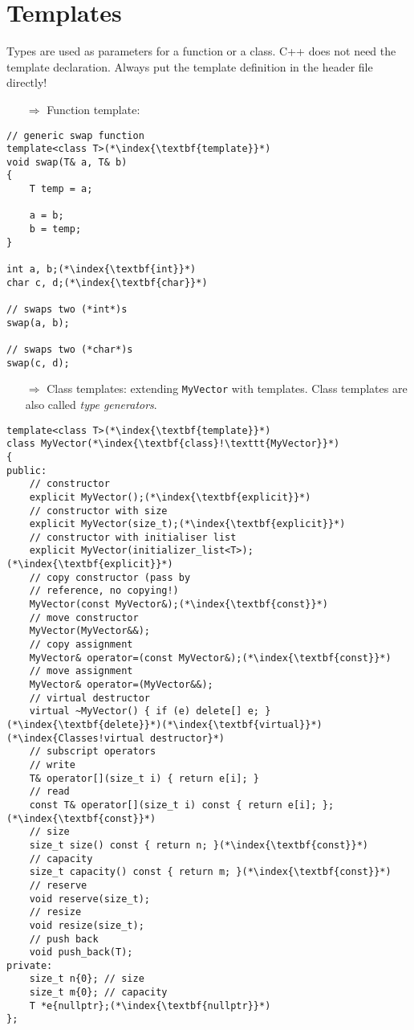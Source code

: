 \documentclass[10pt]{article}
\begin{document}
\section{Templates}
\small
Types are used as parameters for a function or a class.  C++ does not need the template declaration. Always put the 
template definition in the header file directly!
\begin{enumerate}
\item[$\Rightarrow$] Function template:
\end{enumerate}
\begin{lstlisting}
// generic swap function
template<class T>(*\index{\textbf{template}}*)
void swap(T& a, T& b)
{
    T temp = a;
    
    a = b;
    b = temp;
}

int a, b;(*\index{\textbf{int}}*)
char c, d;(*\index{\textbf{char}}*)

// swaps two (*int*)s
swap(a, b);

// swaps two (*char*)s
swap(c, d);
\end{lstlisting}
\begin{enumerate}
\item[$\Rightarrow$] Class templates: extending \texttt{MyVector} with templates. Class templates are also called \emph{type generators}.
\end{enumerate}
\begin{lstlisting}
template<class T>(*\index{\textbf{template}}*)
class MyVector(*\index{\textbf{class}!\texttt{MyVector}}*)
{
public:
    // constructor
    explicit MyVector();(*\index{\textbf{explicit}}*)
    // constructor with size
    explicit MyVector(size_t);(*\index{\textbf{explicit}}*)
    // constructor with initialiser list
    explicit MyVector(initializer_list<T>);(*\index{\textbf{explicit}}*)
    // copy constructor (pass by
    // reference, no copying!)
    MyVector(const MyVector&);(*\index{\textbf{const}}*)
    // move constructor
    MyVector(MyVector&&);
    // copy assignment
    MyVector& operator=(const MyVector&);(*\index{\textbf{const}}*)
    // move assignment
    MyVector& operator=(MyVector&&);
    // virtual destructor
    virtual ~MyVector() { if (e) delete[] e; }(*\index{\textbf{delete}}*)(*\index{\textbf{virtual}}*)(*\index{Classes!virtual destructor}*)
    // subscript operators
    // write
    T& operator[](size_t i) { return e[i]; }
    // read
    const T& operator[](size_t i) const { return e[i]; };(*\index{\textbf{const}}*)
    // size
    size_t size() const { return n; }(*\index{\textbf{const}}*)
    // capacity
    size_t capacity() const { return m; }(*\index{\textbf{const}}*)
    // reserve
    void reserve(size_t);
    // resize
    void resize(size_t);
    // push back
    void push_back(T);
private:
    size_t n{0}; // size
    size_t m{0}; // capacity
    T *e{nullptr};(*\index{\textbf{nullptr}}*)
};
\end{lstlisting}
\end{document}
